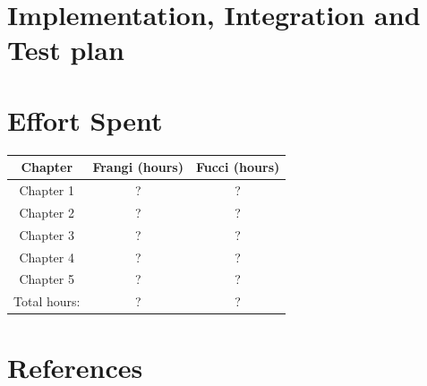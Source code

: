 \documentclass[12pt,a4paper]{report}
\begin{document}
	\chapter{Implementation, Integration and Test plan}

	\chapter{Effort Spent}
		\begin{table}[H]
		\centering
		\begin{tabular}{|c|c|c|}
			\hline
			Chapter & Frangi (hours) & Fucci (hours)\\
			\hline
			\hline
			Chapter 1 & ? & ?\\
			\hline
			Chapter 2 & ? & ?\\
			\hline
			Chapter 3 & ? & ?\\
			\hline
			Chapter 4 & ? & ?\\
			\hline
			Chapter 5 & ? & ?\\
			\hline
			Total hours: & ? & ?\\
			\hline
		\end{tabular}
		\label{tab: }
	\end{table}
	\chapter{References}
\end{document}
